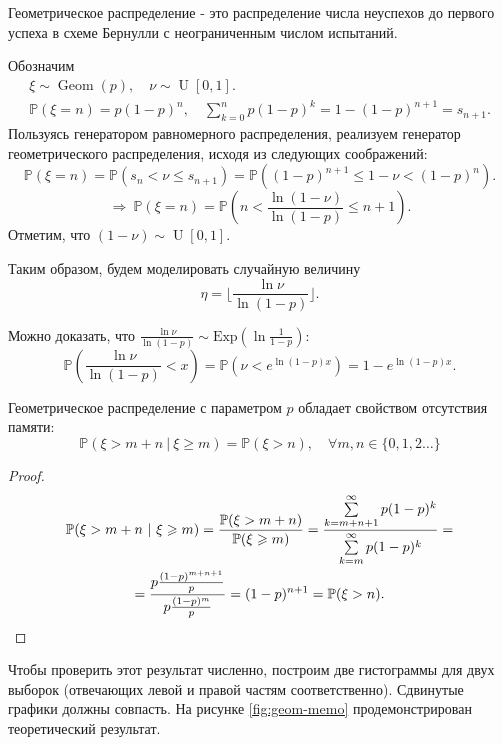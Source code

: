 \documentclass[11pt]{report}
\begin{document}
\begin{definition}
Геометрическое распределение - это распределение числа неуспехов до первого успеха в схеме Бернулли с неограниченным числом испытаний.
\end{definition}

Обозначим
\begin{gather*}
\xi \sim \operatorname{Geom}(p),\quad \nu \sim \operatorname{U}[0,1].\\
\mathbb{P}(\xi = n) = p(1-p)^n,\quad \sum_{k=0}^{n} p(1-p)^k = 1 - (1-p)^{n+1} = s_{n+1}.
\end{gather*}
Пользуясь генератором равномерного распределения, реализуем генератор геометрического распределения, исходя из следующих соображений:
$$
\mathbb{P}(\xi = n) = \mathbb{P}(s_{n}<\nu\leqslant s_{n+1}) = \mathbb{P}((1-p)^{n+1} \leqslant 1-\nu < (1-p)^{n}).
$$
$$
\Longrightarrow~ \boxed{\mathbb{P}(\xi = n) = \mathbb{P}\left( n < \dfrac{\ln{(1-\nu)}}{\ln(1-p)} \leqslant n+1  \right).}
$$
Отметим, что $(1-\nu) \sim \operatorname{U}[0,1]$.

Таким образом, будем моделировать случайную величину
$$
\eta = \bigg\lfloor \dfrac{\ln\nu}{\ln(1-p)} \bigg\rfloor.
$$

Можно доказать, что $\frac{\ln\nu}{\ln(1-p)}\sim\mathrm{Exp}(\ln\frac{1}{1-p})$:
$$
\mathbb{P}\left(\frac{\ln\nu}{\ln(1-p)}<x\right) = \mathbb{P}(\nu < e^{\ln(1-p)x}) = 1 - e^{\ln(1-p)x}.
$$

\begin{statement}
Геометрическое распределение с параметром $p$ обладает свойством отсутствия памяти:
$$
\mathbb{P}(\xi > m+n ~\vert~ \xi \geqslant m) = \mathbb{P}(\xi > n),\quad \forall m,n \in \{0,1,2\dots\}
$$
\end{statement}
\begin{proof}
\begin{gather*}
\mathbb{P}(\xi > m+n ~\vert~ \xi \geqslant m) = \dfrac{\mathbb{P}(\xi > m+n)}{\mathbb{P}(\xi \geqslant m)} = \dfrac{\sum\limits^{\infty}_{k=m+n+1}p(1-p)^k}{\sum\limits^{\infty}_{k=m}p(1-p)^k} = \\
= \dfrac{p\frac{(1-p)^{m+n+1}}{p}}{p\frac{(1-p)^{m}}{p}} = (1-p)^{n+1} = \mathbb{P}(\xi>n).
\end{gather*}
\end{proof}



Чтобы проверить этот результат численно, построим две гистограммы для двух выборок (отвечающих левой и правой частям соответственно).
Сдвинутые графики должны совпасть. На рисунке \ref{fig:geom-memo} продемонстрирован теоретический результат.
\end{document}

